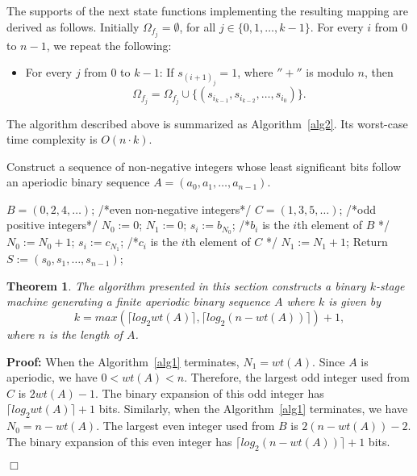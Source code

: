 \documentclass[twocolumn]{IEEEtran} \usepackage{epsfig}
\newtheorem{theorem}{Theorem}
\begin{document}
The supports of the next state functions 
implementing the resulting mapping are derived as follows.
Initially $\Omega_{f_j} = \emptyset$, for all $j \in \{0,1,\ldots,k-1\}$. For every $i$ from 0 to $n-1$,
we repeat the following:

\begin{itemize}
\item[]
For every $j$ from 0 to $k-1$: If $s_{(i+1)_j} = 1$, where $''+''$ is modulo $n$, then 
\[
\Omega_{f_j} = \Omega_{f_j} \cup \{(s_{i_{k-1}},s_{i_{k-2}},\ldots, s_{i_0})\}.
\]
\end{itemize}

The algorithm described above is summarized as Algorithm~\ref{alg2}.
Its worst-case time complexity is $O(n \cdot k)$.

\begin{algorithm}[t]
\caption{Construct a sequence of non-negative integers whose least significant bits
follow an aperiodic binary sequence $A = (a_0, a_1, \ldots, a_{n-1})$.}
\label{alg1}
\begin{algorithmic}[1]
\STATE $B = (0,2,4,\ldots)$; /*even non-negative integers*/
\STATE $C = (1,3,5,\ldots)$; /*odd positive integers*/
\STATE $N_0 := 0$;
\STATE $N_1 := 0$;
\STATE $s_i := b_{N_0}$; /*$b_i$ is the $i$th element of $B$ */
\STATE $N_0 := N_0 + 1$;
\ELSE
\STATE $s_i := c_{N_1}$; /*$c_i$ is the $i$th element of $C$ */
\STATE $N_1 := N_1 + 1$;
\ENDIF
\ENDFOR
\STATE Return $S := (s_0, s_1, \ldots, s_{n-1})$;
\end{algorithmic}
\end{algorithm}

\begin{theorem} \label{th1}
The algorithm presented in this section constructs a binary $k$-stage machine 
generating a finite aperiodic binary sequence $A$ where $k$ is given by
\begin{equation} \label{bound}
k = max(\lceil log_2 wt(A) \rceil, \lceil log_2 (n-wt(A)) \rceil) + 1,
\end{equation}
where $n$ is the length of $A$.
\end{theorem}
{\bf Proof:}  
When the Algorithm~\ref{alg1} terminates, $N_1 = wt(A)$.
Since $A$ is aperiodic, we have $0 < wt(A) < n$.
Therefore,  the largest odd integer used from $C$ is $2 wt(A) - 1$.
The binary expansion of this odd integer has $\lceil log_2 wt(A) \rceil+ 1$ bits.
Similarly, when the Algorithm~\ref{alg1} terminates, we have $N_0 = n-wt(A)$.
The largest even integer used from $B$ is $2 (n-wt(A)) - 2$.
The binary expansion of this even integer has $\lceil log_2 (n-wt(A)) \rceil + 1$ bits.
\begin{flushright}
$\Box$
\end{flushright}
\end{document}
